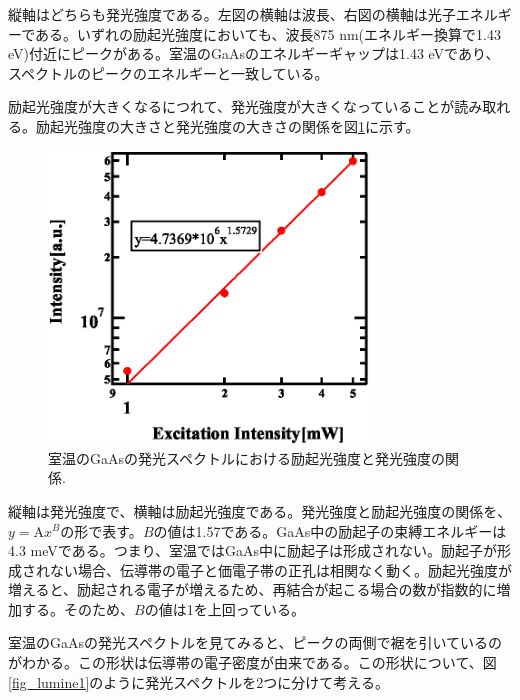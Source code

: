 \documentclass[11pt,a4j]{jsarticle}
\begin{document}
縦軸はどちらも発光強度である。左図の横軸は波長、右図の横軸は光子エネルギーである。いずれの励起光強度においても、波長875 nm(エネルギー換算で1.43 eV)付近にピークがある。室温のGaAsのエネルギーギャップは1.43 eVであり\cite{gapE}、スペクトルのピークのエネルギーと一致している。


励起光強度が大きくなるにつれて、発光強度が大きくなっていることが読み取れる。励起光強度の大きさと発光強度の大きさの関係を図\ref{fig_gaas_rt_int1}に示す。
\newpage

\begin{figure}[ht]
 \centering
 \includegraphics[clip,width=8.5cm]{start2_GaAs_rt_Int.eps}
 \caption{室温のGaAsの発光スペクトルにおける励起光強度と発光強度の関係.}
 \label{fig_gaas_rt_int1}
\end{figure}

縦軸は発光強度で、横軸は励起光強度である。発光強度と励起光強度の関係を、$y=\mathrm{A}x^{B}$の形で表す。$B$の値は1.57である。GaAs中の励起子の束縛エネルギーは4.3 meVである\cite{exciton}。つまり、室温ではGaAs中に励起子は形成されない。励起子が形成されない場合、伝導帯の電子と価電子帯の正孔は相関なく動く。励起光強度が増えると、励起される電子が増えるため、再結合が起こる場合の数が指数的に増加する。そのため、$B$の値は1を上回っている。


室温のGaAsの発光スペクトルを見てみると、ピークの両側で裾を引いているのがわかる。この形状は伝導帯の電子密度が由来である。この形状について、図\ref{fig_lumine1}のように発光スペクトルを2つに分けて考える。
\end{document}
